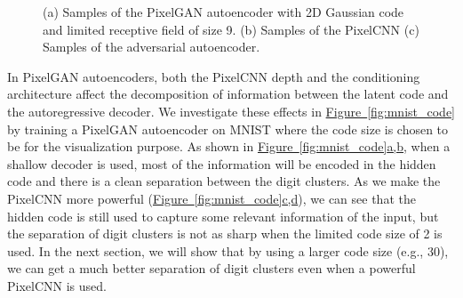 \documentclass{article}
\newcommand{\myfig}[1]{\hyperref[fig:#1]{Figure~\ref*{fig:#1}}}
\newcommand{\myfiggg}[3]{\hyperref[fig:#1]{Figure~\ref*{fig:#1}#2,#3}}
\begin{document}
\begin{figure}[t]
\centering
\hspace*{0.8cm}
\hspace{.13cm}
\hspace*{0.8cm}
\hspace{.13cm}
\hspace*{1cm}
\vspace{-.3cm}
\caption{\label{fig:mnist}(a) Samples of the PixelGAN autoencoder with 2D Gaussian code and limited receptive field of size 9. (b) Samples of the PixelCNN (c) Samples of the adversarial autoencoder.}
\end{figure}


In PixelGAN autoencoders, both the PixelCNN depth and the conditioning architecture affect the decomposition of information between the latent code and the autoregressive decoder. 
We investigate these effects in \myfig{mnist_code} by training a PixelGAN autoencoder on MNIST where the code size is chosen to be  for the visualization purpose. 
As shown in \myfiggg{mnist_code}{a}{b}, when a shallow decoder is used, most of the information will be encoded in the hidden code and there is a clean separation between the digit clusters. As we make the PixelCNN more powerful (\myfiggg{mnist_code}{c}{d}), we can see that the hidden code is still used to capture some relevant information of the input, but the separation of digit clusters is not as sharp when the limited code size of 2 is used. In the next section, we will show that by using a larger code size (e.g., 30), we can get a much better separation of digit clusters even when a powerful PixelCNN is used. 
\end{document}
